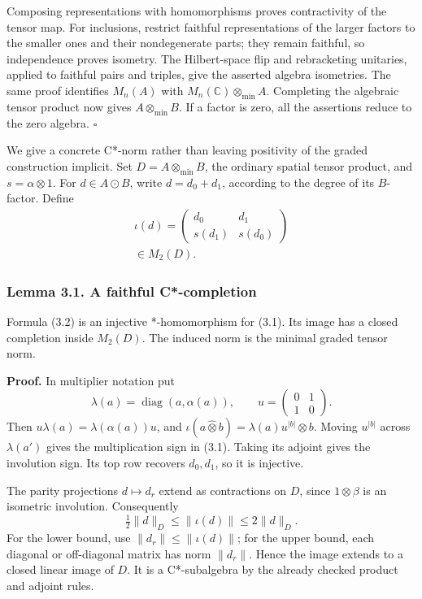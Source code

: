 \documentclass[
  11pt,
]{article}
\begin{document}
Composing representations with homomorphisms proves contractivity of the
tensor map. For inclusions, restrict faithful representations of the
larger factors to the smaller ones and their nondegenerate parts; they
remain faithful, so independence proves isometry. The Hilbert-space flip
and rebracketing unitaries, applied to faithful pairs and triples, give
the asserted algebra isometries. The same proof identifies \(M_n(A)\)
with \(M_n(\mathbb C)\otimes_{\min}A\). Completing the algebraic tensor
product now gives \(A\otimes_{\min}B\). If a factor is zero, all the
assertions reduce to the zero algebra. \(\square\)

We give a concrete C*-norm rather than leaving positivity of the graded
construction implicit. Set \(D=A\otimes_{\min}B\), the ordinary spatial
tensor product, and \(s=\alpha\otimes1\). For \(d\in A\odot B\), write
\(d=d_0+d_1\), according to the degree of its \(B\)-factor. Define \[
\begin{gathered}
\iota(d)=
\begin{pmatrix}
d_0&d_1\\ s(d_1)&s(d_0)
\end{pmatrix}
\\\in M_2(D).
\end{gathered}
\tag{3.2}
\]

\subsubsection{Lemma 3.1. A faithful
C*-completion}\label{lemma-3.1.-a-faithful-c-completion}

Formula (3.2) is an injective *-homomorphism for (3.1). Its image has a
closed completion inside \(M_2(D)\). The induced norm is the minimal
graded tensor norm.

\textbf{Proof.} In multiplier notation put \[
\lambda(a)=\operatorname{diag}(a,\alpha(a)),\qquad
u=\begin{pmatrix}0&1\\1&0\end{pmatrix}.
\] Then \(u\lambda(a)=\lambda(\alpha(a))u\), and
\(\iota(a\widehat\otimes b)=\lambda(a)u^{|b|}\otimes b\). Moving
\(u^{|b|}\) across \(\lambda(a')\) gives the multiplication sign in
(3.1). Taking its adjoint gives the involution sign. Its top row
recovers \(d_0,d_1\), so it is injective.

The parity projections \(d\mapsto d_r\) extend as contractions on \(D\),
since \(1\otimes\beta\) is an isometric involution. Consequently \[
\tfrac12\|d\|_D\leq\|\iota(d)\|\leq2\|d\|_D.
\tag{3.3}
\] For the lower bound, use \(\|d_r\|\leq\|\iota(d)\|\); for the upper
bound, each diagonal or off-diagonal matrix has norm \(\|d_r\|\). Hence
the image extends to a closed linear image of \(D\). It is a
C*-subalgebra by the already checked product and adjoint rules.
\end{document}
